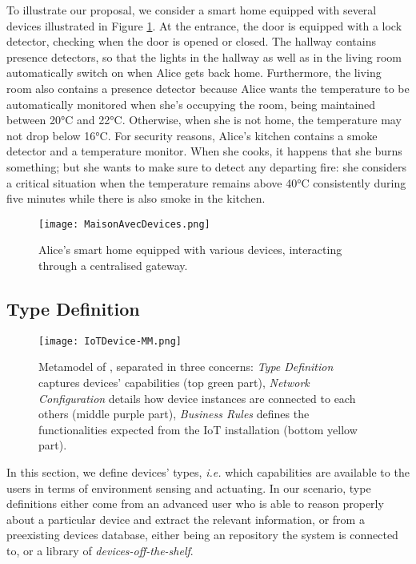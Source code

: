 To illustrate our proposal, we consider a smart home equipped with several devices illustrated in Figure \ref{fig:RE}. At the entrance, the door is equipped with a lock detector, checking when the door is opened or closed. The hallway contains presence detectors, so that the lights in the hallway as well as in the living room automatically switch on when Alice gets back home. Furthermore, the living room also contains a presence detector because Alice wants the temperature to be automatically monitored when she's occupying the room, being maintained between 20°C and 22°C. Otherwise, when she is not home, the temperature may not drop below 16°C. For security reasons, Alice's kitchen contains a smoke detector and a temperature monitor. When she cooks, it happens that she burns something; but she wants to make sure to detect any departing fire: she considers a critical situation when the temperature remains above 40°C consistently during five minutes while there is also smoke in the kitchen. 

\begin{figure}[t]%
  \texttt{[image: MaisonAvecDevices.png]}%
  \caption{Alice's smart home equipped with various devices, interacting through a centralised gateway.}%
  \label{fig:RE}%
\end{figure}



\subsection{Type Definition}
\label{sec:IoTDSL-Type}

\begin{figure*}%
  \centering  
  \texttt{[image: IoTDevice-MM.png]}%
  \caption{Metamodel of \IOTDSL, separated in three concerns: \emph{Type Definition} captures devices' capabilities (top green part), \emph{Network Configuration} details how device instances are connected to each others (middle purple part), \emph{Business Rules} defines the functionalities expected from the IoT installation (bottom yellow part).}%
  \label{fig:IoTDevice-MM}%
\end{figure*}


In this section, we define \IOT devices' types, \textit{i.e.} which capabilities are available to the users in terms of environment sensing and actuating. In our scenario, type definitions either come from an advanced user who is able to reason properly about a particular device and extract the relevant information, or from a preexisting devices database, either being an repository the system is connected to, or a library of \textit{devices-off-the-shelf}. 

